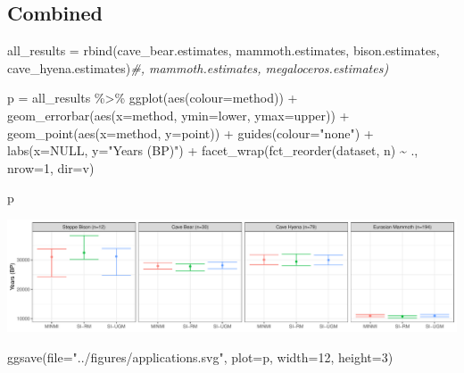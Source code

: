 \documentclass[
]{article}
\newenvironment{Shaded}{\begin{snugshade}}{\end{snugshade}}
\newcommand{\AttributeTok}[1]{\textcolor[rgb]{0.77,0.63,0.00}{#1}}
\newcommand{\CommentTok}[1]{\textcolor[rgb]{0.56,0.35,0.01}{\textit{#1}}}
\newcommand{\ConstantTok}[1]{\textcolor[rgb]{0.00,0.00,0.00}{#1}}
\newcommand{\DecValTok}[1]{\textcolor[rgb]{0.00,0.00,0.81}{#1}}
\newcommand{\FunctionTok}[1]{\textcolor[rgb]{0.00,0.00,0.00}{#1}}
\newcommand{\NormalTok}[1]{#1}
\newcommand{\OtherTok}[1]{\textcolor[rgb]{0.56,0.35,0.01}{#1}}
\newcommand{\SpecialCharTok}[1]{\textcolor[rgb]{0.00,0.00,0.00}{#1}}
\newcommand{\StringTok}[1]{\textcolor[rgb]{0.31,0.60,0.02}{#1}}
\begin{document}
\hypertarget{combined}{%
\subsection{Combined}\label{combined}}

\begin{Shaded}
\begin{Highlighting}[]
\NormalTok{all\_results }\OtherTok{=} \FunctionTok{rbind}\NormalTok{(cave\_bear.estimates, mammoth.estimates, bison.estimates, cave\_hyena.estimates)}\CommentTok{\#, mammoth.estimates, megaloceros.estimates)}

\NormalTok{p }\OtherTok{=}\NormalTok{ all\_results }\SpecialCharTok{\%\textgreater{}\%}
  \FunctionTok{ggplot}\NormalTok{(}\FunctionTok{aes}\NormalTok{(}\AttributeTok{colour=}\NormalTok{method)) }\SpecialCharTok{+}
  \FunctionTok{geom\_errorbar}\NormalTok{(}\FunctionTok{aes}\NormalTok{(}\AttributeTok{x=}\NormalTok{method, }\AttributeTok{ymin=}\NormalTok{lower, }\AttributeTok{ymax=}\NormalTok{upper)) }\SpecialCharTok{+} 
  \FunctionTok{geom\_point}\NormalTok{(}\FunctionTok{aes}\NormalTok{(}\AttributeTok{x=}\NormalTok{method, }\AttributeTok{y=}\NormalTok{point)) }\SpecialCharTok{+}
  \FunctionTok{guides}\NormalTok{(}\AttributeTok{colour=}\StringTok{"none"}\NormalTok{) }\SpecialCharTok{+}
  \FunctionTok{labs}\NormalTok{(}\AttributeTok{x=}\ConstantTok{NULL}\NormalTok{, }\AttributeTok{y=}\StringTok{"Years (BP)"}\NormalTok{) }\SpecialCharTok{+}
  \FunctionTok{facet\_wrap}\NormalTok{(}\FunctionTok{fct\_reorder}\NormalTok{(dataset, n) }\SpecialCharTok{\textasciitilde{}}\NormalTok{ ., }\AttributeTok{nrow=}\DecValTok{1}\NormalTok{, }\AttributeTok{dir=}\StringTok{\textquotesingle{}v\textquotesingle{}}\NormalTok{)}

\NormalTok{p}
\end{Highlighting}
\end{Shaded}

\includegraphics{applications_files/figure-latex/unnamed-chunk-12-1.pdf}

\begin{Shaded}
\begin{Highlighting}[]
\FunctionTok{ggsave}\NormalTok{(}\AttributeTok{file=}\StringTok{"../figures/applications.svg"}\NormalTok{, }\AttributeTok{plot=}\NormalTok{p, }\AttributeTok{width=}\DecValTok{12}\NormalTok{, }\AttributeTok{height=}\DecValTok{3}\NormalTok{)}
\end{Highlighting}
\end{Shaded}
\end{document}

